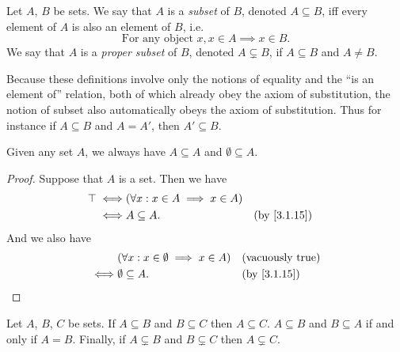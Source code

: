 \begin{defn}[Subsets]\label{3.1.15}
  Let \(A\), \(B\) be sets.
  We say that \(A\) is a \emph{subset} of \(B\), denoted \(A \subseteq B\), iff every element of \(A\) is also an element of \(B\), i.e.
  \[
    \text{For any object } x, x \in A \implies x \in B.
  \]
  We say that \(A\) is a \emph{proper subset} of \(B\), denoted \(A \subsetneq B\), if \(A \subseteq B\) and \(A \neq B\).
\end{defn}

\begin{rmk}\label{3.1.16}
  Because these definitions involve only the notions of equality and the ``is an element of'' relation, both of which already obey the axiom of substitution, the notion of subset also automatically obeys the axiom of substitution.
  Thus for instance if \(A \subseteq B\) and \(A = A'\), then \(A' \subseteq B\).
\end{rmk}

\begin{eg}\label{3.1.17}
  Given any set \(A\), we always have \(A \subseteq A\) and \(\emptyset \subseteq A\).
\end{eg}

\begin{proof}
  Suppose that \(A\) is a set.
  Then we have
  \begin{align*}
    \top \iff & (\forall x : x \in A \implies x \in A)                  \\
    \iff      & A \subseteq A.                         &  & \by{3.1.15}
  \end{align*}
  And we also have
  \begin{align*}
         & (\forall x : x \in \emptyset \implies x \in A) &  & \text{(vacuously true)} \\
    \iff & \emptyset \subseteq A.                         &  & \by{3.1.15}
  \end{align*}
\end{proof}

\begin{prop}\label{3.1.18}
  Let \(A\), \(B\), \(C\) be sets.
  If \(A \subseteq B\) and \(B \subseteq C\) then \(A \subseteq C\).
  \(A \subseteq B\) and \(B \subseteq A\) if and only if \(A = B\).
  Finally, if \(A \subsetneq B\) and \(B \subsetneq C\) then \(A \subsetneq C\).
\end{prop}

